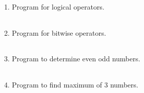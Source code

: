 \documentclass{exam}
\begin{document}
\begin{enumerate}
   \item  Program for logical operators.

   \begin{myTableStyle}
   \begin{center} \begin{tabular}{ |m{14cm}| } \hline
              \\ \hline
    \end{tabular} \end{center}
\end{myTableStyle}
  \pagebreak

   \item  Program for bitwise operators.

   \begin{myTableStyle}
   \begin{center} \begin{tabular}{ |m{14cm}| } \hline
              \\ \hline
    \end{tabular} \end{center}
\end{myTableStyle}
  \pagebreak

   \item  Program to determine even odd numbers.

   \begin{myTableStyle}
   \begin{center} \begin{tabular}{ |m{14cm}| } \hline
              \\ \hline
    \end{tabular} \end{center}
\end{myTableStyle}
  \pagebreak

   \item  Program to find maximum of 3 numbers.

   \begin{myTableStyle}
   \begin{center} \begin{tabular}{ |m{14cm}| } \hline
              \\ \hline
    \end{tabular} \end{center}
\end{myTableStyle}
  \pagebreak


\end{enumerate}
\end{document}
